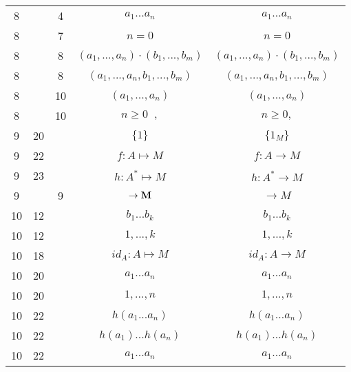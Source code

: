 \documentclass[a4paper,11pt]{article}
\begin{document}
\begin{center}
\begin{tabular}{|c|c|c|c|c|}
    8  & &  4 & $a_{ 1 } ... a_{ n }$ & $a_{ 1 } \ldots a_{ n }$ \\
    8  & &  7 & $n \!\! = \!\! 0$ & $n = 0$ \\
    8  & &  8 & $( a_{ 1 }, ..., a_{ n } ) \cdot ( b_{ 1 }, ..., b_{ m } )$
           & $( a_{ 1 }, \ldots, a_{ n } ) \cdot ( b_{ 1 }, \ldots, b_{ m } )$ \\
    8  & &  8 & $( a_{ 1 }, ..., a_{ n }, b_{ 1 }, ..., b_{ m } )$
           & $( a_{ 1 }, \ldots, a_{ n }, b_{ 1 }, \ldots, b_{ m } )$ \\
    8  & & 10 & $( a_{ 1 }, ..., a_{ n } )$ & $( a_{ 1 }, \ldots, a_{ n } )$ \\
    8  & & 10 & $n \geq 0\;\;,$ & $n \geq 0,$ \\
    9  & 20 & & $\{ 1 \}$ & $\{ 1_{ M } \}$ \\
    9  & 22 & & $f : A \mapsto M$ & $f : A \to M$ \\
    9  & 23 & & $h : A^{ * } \mapsto M$ & $h : A^{ * } \to M$ \\
    9  & &  9 & $\to \textrm{\textbf{M}}$ & $\to M$ \\
    10 & 12 & & $b_{ 1 } ... b_{ k }$ & $b_{ 1 } \ldots b_{ k }$ \\
    10 & 12 & & $1, ..., k$ & $1, \ldots, k$ \\
    10 & 18 & & $id_{ A } : A \mapsto M$ & $id_{ A } : A \to M$ \\
    10 & 20 & & $a_{ 1 } ... a_{ n }$ & $a_{ 1 } \ldots a_{ n }$ \\
    10 & 20 & & $1, ..., n$ & $1, \ldots, n$ \\
    10 & 22 & & $h( a_{ 1 } ... a_{ n } )$ & $h( a_{ 1 } \ldots a_{ n } )$ \\
    10 & 22 & & $h( a_{ 1 } ) ... h( a_{ n } )$
           & $h( a_{ 1 } ) \ldots h( a_{ n } )$ \\
    10 & 22 & & $a_{ 1 } ... a_{ n }$ & $a_{ 1 } \ldots a_{ n }$ \\
    \hline
  \end{tabular}





  \newpage


\end{center}
\end{document}
